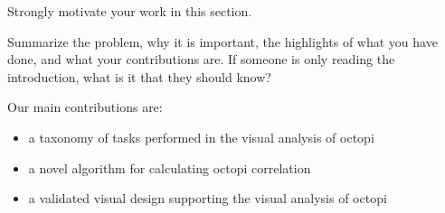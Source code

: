 
Strongly motivate your work in this section.

Summarize the problem, why it is important, the highlights of what you have
done, and what your contributions are. If someone is only reading the
introduction, what is it that they should know?

Our main contributions are:
\begin{itemize}
  \item a taxonomy of tasks performed in the visual analysis of octopi
  \item a novel algorithm for calculating octopi correlation
  \item a validated visual design supporting the visual analysis of octopi
\end{itemize}

